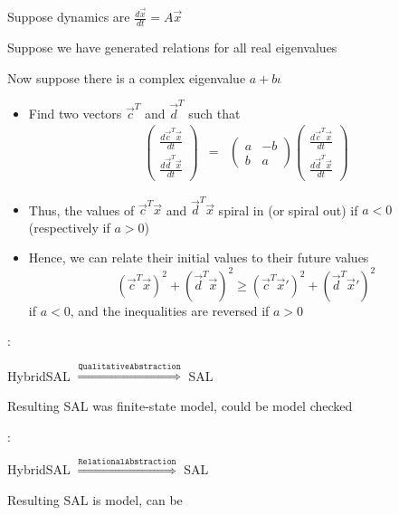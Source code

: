 \documentclass{seminar}
\begin{document}
\begin{slide}

Suppose dynamics are $\frac{d\vec{x}}{dt} = A\vec{x}$

Suppose we have generated relations for all real eigenvalues

Now suppose there is a complex eigenvalue $a + b\iota$

\begin{itemize}
\item Find two vectors $\vec{c}^T$ and $\vec{d}^T$ such that
\begin{eqnarray*}
 \left(\begin{array}{c}
 \frac{d\vec{c}^T\vec{x}}{dt} \\
 \frac{d\vec{d}^T\vec{x}}{dt} 
 \end{array}\right)
 & = & 
  \left(\begin{array}{cc}
   a & -b \\ b & a
  \end{array}\right)
 \left(\begin{array}{c}
 \frac{d\vec{c}^T\vec{x}}{dt} \\
 \frac{d\vec{d}^T\vec{x}}{dt} 
 \end{array}\right)
\end{eqnarray*}

\item
 Thus,
 the values of $\vec{c}^T\vec{x}$ and $\vec{d}^T\vec{x}$ 
 spiral in (or spiral out) if $a < 0$ (respectively if $a > 0$) 

\item
 Hence, we can relate their initial values to their future values
$$
 (\vec{c}^T \vec{x})^2 + 
 (\vec{d}^T \vec{x})^2 
 \geq
 ({\vec{c}}^{T} \vec{x}')^2 + 
 ({\vec{d}}^{T} \vec{x}')^2 
$$
if $a < 0$, and the inequalities are reversed if $a > 0$
 
\end{itemize}

\end{slide}
\begin{slide}

{}:

\begin{center}
HybridSAL  $\stackrel{\mathtt{Qualitative Abstraction}}{\Longrightarrow}$ SAL
\end{center}
Resulting SAL was finite-state model, could be model checked


\bigskip

{}:
\begin{center}
HybridSAL  $\stackrel{\mathtt{Relational Abstraction}}{\Longrightarrow}$ SAL
\end{center}
Resulting SAL is {} model, can be {}

\end{slide}
\end{document}
